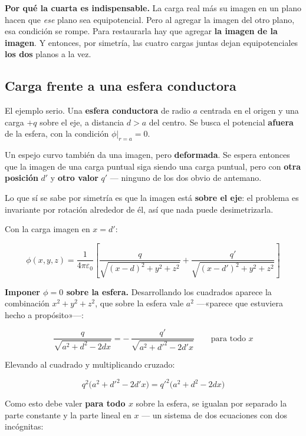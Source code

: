 \documentclass[12pt,a4paper]{article}
\begin{document}
\textbf{Por qué la cuarta es indispensable.} La carga real más su imagen en un
plano hacen que \emph{ese} plano sea equipotencial. Pero al agregar la imagen del
otro plano, esa condición se rompe. Para restaurarla hay que agregar \textbf{la
imagen de la imagen}. Y entonces, por simetría, las cuatro cargas juntas dejan
equipotenciales \textbf{los dos} planos a la vez.

\subsection{Carga frente a una esfera conductora}

El ejemplo serio. Una \textbf{esfera conductora} de radio $a$ centrada en el origen
y una carga $+q$ sobre el eje, a distancia $d > a$ del centro. Se busca el
potencial \textbf{afuera} de la esfera, con la condición $\phi\big|_{r=a} = 0$.

\begin{notebox}
Un espejo curvo también da una imagen, pero \textbf{deformada}. Se espera entonces
que la imagen de una carga puntual siga siendo una carga puntual, pero con
\textbf{otra posición} $d'$ y \textbf{otro valor} $q'$ --- ninguno de los dos obvio
de antemano.

Lo que sí se sabe por simetría es que la imagen está \textbf{sobre el eje}: el
problema es invariante por rotación alrededor de él, así que nada puede
desimetrizarla.
\end{notebox}

Con la carga imagen en $x = d'$:

\[
\phi(x,y,z) = \frac{1}{4\pi\varepsilon_0}\left[
\frac{q}{\sqrt{(x-d)^2+y^2+z^2}} + \frac{q'}{\sqrt{(x-d')^2+y^2+z^2}}\right]
\]

\textbf{Imponer $\phi=0$ sobre la esfera.} Desarrollando los cuadrados aparece la
combinación $x^2+y^2+z^2$, que sobre la esfera vale $a^2$ ---«parece que estuviera
hecho a propósito»---:

\[
\frac{q}{\sqrt{a^2+d^2-2dx}} = -\,\frac{q'}{\sqrt{a^2+d'^2-2d'x}}
\qquad\text{para todo } x
\]

Elevando al cuadrado y multiplicando cruzado:

\[
q^2\big(a^2+d'^2-2d'x\big) = q'^2\big(a^2+d^2-2dx\big)
\]

Como esto debe valer \textbf{para todo $x$} sobre la esfera, se igualan por
separado la parte constante y la parte lineal en $x$ --- un sistema de dos
ecuaciones con dos incógnitas:
\end{document}
